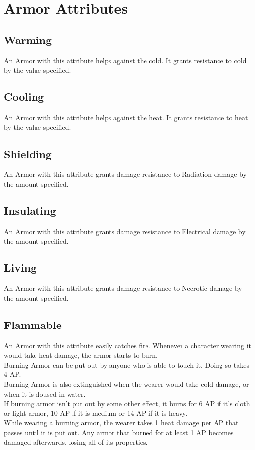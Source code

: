 \section{Armor Attributes}\label{sec:armorAttributes}

\subsection{Warming}\label{armor:warming}
An Armor with this attribute helps against the cold.
It grants resistance to cold by the value specified.

\subsection{Cooling}\label{armor:cooling}
An Armor with this attribute helps against the heat.
It grants resistance to heat by the value specified.

\subsection{Shielding}\label{armor:shielding}
An Armor with this attribute grants damage resistance to Radiation damage by the amount specified.

\subsection{Insulating}\label{armor:insulating}
An Armor with this attribute grants damage resistance to Electrical damage by the amount specified.

\subsection{Living}\label{armor:living}
An Armor with this attribute grants damage resistance to Necrotic damage by the amount specified.

\subsection{Flammable}\label{armor:flammable}
An Armor with this attribute easily catches fire.
Whenever a character wearing it would take heat damage, the armor starts to burn.\\
Burning Armor can be put out by anyone who is able to touch it.
Doing so takes 4 AP.\\
Burning Armor is also extinguished when the wearer would take cold damage, or when it is doused in water.\\
If burning armor isn't put out by some other effect, it burns for 6 AP if it's cloth or light armor, 10 AP if it is medium or 14 AP if it is heavy.\\
While wearing a burning armor, the wearer takes 1 heat damage per AP that passes until it is put out.
Any armor that burned for at least 1 AP becomes damaged afterwards, losing all of its properties.

